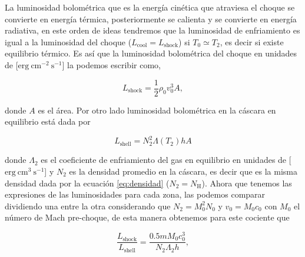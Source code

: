 La luminosidad bolométrica que  es la energía cinética que atraviesa el choque se convierte en energía térmica, posteriormente se calienta y se convierte en energía radiativa, en este orden de ideas tendremos que la luminosidad de enfriamiento es igual a la luminosidad del choque (\(L_{\text{cool}} = L_{\text{shock}}\)) si \(T_{0} \simeq T_{2}\), es decir si existe equilibrio térmico. Es así que la luminosidad bolométrica del choque en unidades de [\(\mathrm{erg~cm^{-2}~s^{-1}}\)] la podemos escribir como,

\begin{equation}
  \label{eq:lumi-shock}
  L_{\text{shock}} = \frac{1}{2} \rho_{0} v^{3}_{0} A,
\end{equation}

donde \(A\) es el área. Por otro lado luminosidad bolométrica en la cáscara en equilibrio está dada por 

\begin{equation}
  \label{eq:equi}
  L_{\text{shell}} = N^{2}_{2} \Lambda(T_{2}) h A
\end{equation}

donde \(\Lambda_{2}\) es el coeficiente de enfriamiento del gas en equilibrio en unidades de [\(\mathrm{erg~cm^{3}~s^{-1}}\)] y \(N_{2}\) es la densidad promedio en la cáscara, es decir que es la misma densidad dada por la ecuación \ref{eq:densidad} (\(N_{2} = N_{\text{H}}\)). Ahora que tenemos las expresiones de las luminosidades para cada zona, las podemos comparar dividiendo una entre la otra considerando que \(N_{2} = M^{2}_{0} N_{0}\) y \(v_{0} = M_{0} c_{0}\) con \(M_{0}\) el número de Mach pre-choque, de esta manera obtenemos para este cociente que

\begin{equation}
  \label{eq:ratio}
  \frac{L_{\text{shock}}}{L_{\text{shell}}} = \frac{0.5 m M_{0} c_{0}^{3}}{N_{2}  \Lambda_{2} h},
\end{equation}

